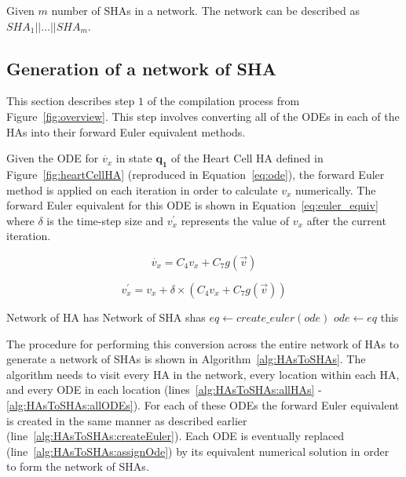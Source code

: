 Given  $m$   number of \acp{SHA} in a network.
The network can be described as $SHA_1 || \dots || SHA_m$.


\subsection{Generation of a network of \ac{SHA}}
\label{sec:shaGeneration}

This section describes step $1$ of the compilation process from Figure~\ref{fig:overview}.
This step involves converting all of the \acp{ODE} in each of the \acp{HA} into their forward Euler equivalent methods.

Given the \ac{ODE} for $\dot{v_x}$ in state $\mathbf{q_1}$ of the Heart Cell \ac{HA} defined in Figure~\ref{fig:heartCellHA} (reproduced in Equation~\ref{eq:ode}), the forward Euler method is applied on each iteration in order to calculate $v_x$ numerically.
The forward Euler equivalent for this ODE is shown in Equation~\ref{eq:euler_equiv} where $\delta$ is the time-step size and $v^\prime_x$ represents the value of $v_x$ after the current iteration.

\begin{equation}
\dot{v_x} = C_{4} v_x + C_{7} g(\vec{v})
\label{eq:ode}
\end{equation}

\begin{equation}
v^\prime_x = v_x + \delta \times (C_{4} v_x + C_{7} g(\vec{v}))
\label{eq:euler_equiv}
\end{equation}

\renewcommand{\algorithmiccomment}[1]{// #1}
\renewcommand{\algorithmicrequire}{\textbf{Input:}}
\renewcommand{\algorithmicensure}{\textbf{Output:}}
\begin{algorithm}[t!]
	\begin{algorithmic}[1]
		\REQUIRE Network of HA has 
		\ENSURE Network of SHA shas
		 \label{alg:HAsToSHAs:allHAs}
		  \label{alg:HAsToSHAs:allLocs}
		 \label{alg:HAsToSHAs:allODEs}
		\STATE $eq \leftarrow create\_euler(ode)$ \label{alg:HAsToSHAs:createEuler}
		\STATE $ode \leftarrow eq$ \label{alg:HAsToSHAs:assignOde}
		\ENDFOR
		\ENDFOR
		\ENDFOR
		\RETURN this
	\end{algorithmic}
	\caption{The algorithm to generate a Network of \acp{SHA} from a Network of \acp{HA}}
	\label{alg:HAsToSHAs}
\end{algorithm}

The procedure for performing this conversion across the entire network of \acp{HA} to generate a network of \acp{SHA} is shown in Algorithm~\ref{alg:HAsToSHAs}.
The algorithm needs to visit every \ac{HA} in the network, every location within each \ac{HA}, and every \ac{ODE} in each location (lines~\ref{alg:HAsToSHAs:allHAs} - \ref{alg:HAsToSHAs:allODEs}).
For each of these \acp{ODE} the forward Euler equivalent is created in the same manner as described earlier (line~\ref{alg:HAsToSHAs:createEuler}).
Each \ac{ODE} is eventually replaced (line~\ref{alg:HAsToSHAs:assignOde}) by its equivalent numerical solution in order to form the network of \acp{SHA}.
